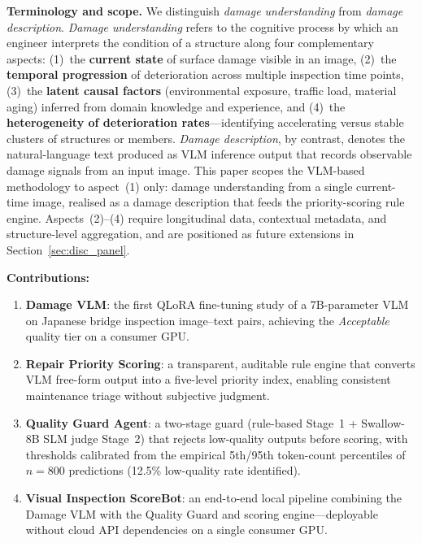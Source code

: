\documentclass[twocolumn]{article}
\begin{document}
\textbf{Terminology and scope.}\label{sec:scope}
We distinguish \textit{damage understanding} from \textit{damage description}.
\textit{Damage understanding} refers to the cognitive process by which an
engineer interprets the condition of a structure along four complementary
aspects: (1)~the \textbf{current state} of surface damage visible in an
image, (2)~the \textbf{temporal progression} of deterioration across
multiple inspection time points, (3)~the \textbf{latent causal factors}
(environmental exposure, traffic load, material aging) inferred from
domain knowledge and experience, and (4)~the \textbf{heterogeneity of
deterioration rates}---identifying accelerating versus stable clusters of
structures or members.
\textit{Damage description}, by contrast, denotes the natural-language text
produced as VLM inference output that records observable damage signals
from an input image.
This paper scopes the VLM-based methodology to aspect~(1) only: damage
understanding from a single current-time image, realised as a damage
description that feeds the priority-scoring rule engine.
Aspects~(2)--(4) require longitudinal data, contextual metadata, and
structure-level aggregation, and are positioned as future extensions in
Section~\ref{sec:disc_panel}.

\textbf{Contributions:}
\begin{enumerate}[leftmargin=*,itemsep=1pt]
  \item \textbf{Damage VLM}: the first QLoRA fine-tuning study of a
        7B-parameter VLM on Japanese bridge inspection image--text pairs,
        achieving the \textit{Acceptable} quality tier on a consumer GPU.
  \item \textbf{Repair Priority Scoring}: a transparent, auditable rule engine
        that converts VLM free-form output into a five-level priority index,
        enabling consistent maintenance triage without subjective judgment.
  \item \textbf{Quality Guard Agent}: a two-stage guard (rule-based Stage~1
        + Swallow-8B SLM judge Stage~2) that rejects low-quality outputs
        before scoring, with thresholds calibrated from the empirical
        5th/95th token-count percentiles of $n=800$ predictions (12.5\%
        low-quality rate identified).
  \item \textbf{Visual Inspection ScoreBot}: an end-to-end local pipeline
        combining the Damage VLM with the Quality Guard and scoring engine---deployable without
        cloud API dependencies on a single consumer GPU.
\end{enumerate}
\end{document}

